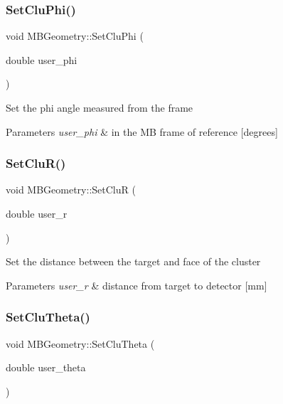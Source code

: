 \subsubsection{\texorpdfstring{Set\+Clu\+Phi()}{SetCluPhi()}}
{\footnotesize\ttfamily void M\+B\+Geometry\+::\+Set\+Clu\+Phi (\begin{DoxyParamCaption}\item[{double}]{user\+\_\+phi }\end{DoxyParamCaption})}

Set the phi angle measured from the frame 
\begin{DoxyParams}{Parameters}
{\em user\+\_\+phi} & in the MB frame of reference \mbox{[}degrees\mbox{]} \\
\hline
\end{DoxyParams}
\mbox{\label{class_m_b_geometry_a292c4326421c78871667e91c3694ae35}} 
\subsubsection{\texorpdfstring{Set\+Clu\+R()}{SetCluR()}}
{\footnotesize\ttfamily void M\+B\+Geometry\+::\+Set\+CluR (\begin{DoxyParamCaption}\item[{double}]{user\+\_\+r }\end{DoxyParamCaption})}

Set the distance between the target and face of the cluster 
\begin{DoxyParams}{Parameters}
{\em user\+\_\+r} & distance from target to detector \mbox{[}mm\mbox{]} \\
\hline
\end{DoxyParams}
\mbox{\label{class_m_b_geometry_a9a2a8c9609141be92d7ba30e6087aa30}} 
\subsubsection{\texorpdfstring{Set\+Clu\+Theta()}{SetCluTheta()}}
{\footnotesize\ttfamily void M\+B\+Geometry\+::\+Set\+Clu\+Theta (\begin{DoxyParamCaption}\item[{double}]{user\+\_\+theta }\end{DoxyParamCaption})}

